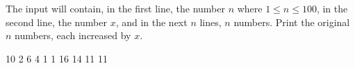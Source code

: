 




The input will contain, in the first line, the number $n$ where $1\leq n\leq 100$, in the second line, the number $x$, and in the next $n$ lines, $n$ numbers. Print the original $n$ numbers, each increased by $x$.

10
2
6
4
1
1
 16 14 11 11
\koniec


